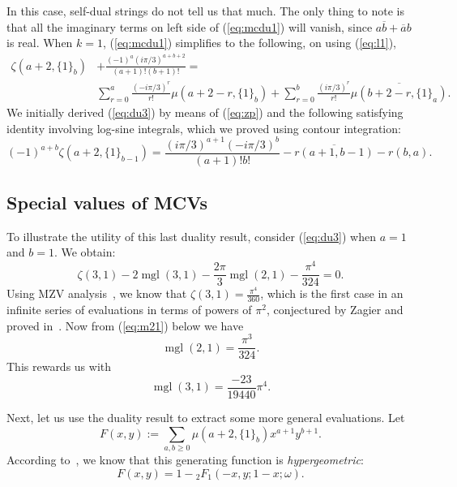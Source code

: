 \documentclass[a4paper,a4paper]{article}
\newcommand{\mgl}{\operatorname{mgl}}
\begin{document}
In this case, self-dual strings do not tell us that much.  The only thing
to note is that all the imaginary terms on left side of (\ref{eq:mcdu1})
will vanish, since $ a\overline{b} + \overline{a}b $ is real.
When $ k = 1 $, (\ref{eq:mcdu1}) simplifies to the following, on using
(\ref{eq:l1}),
\begin{equation}
\begin{split}
\label{eq:du3}
\zeta(a+2, \{ 1 \}_b) &+
\frac{(-1)^a (i\pi/3)^{a+b+2}}{(a+1)!(b+1)!} = \\
&\sum_{r=0}^a \frac{( -i\pi/3 )^r}{r!} \mu(a + 2 - r, \{ 1 \}_b)
+ \sum_{r=0}^b \frac{(i\pi/3)^r}{r!} \overline{\mu(b + 2 - r, \{ 1
\}_a)}.
\end{split}
\end{equation}
We initially derived (\ref{eq:du3}) by means of (\ref{eq:zp}) and the following
satisfying identity involving log-sine integrals, which we proved
using contour
integration:
\begin{equation}
\label{eq:jz}
(-1)^{a+b}\zeta(a+2, \{ 1 \}_{b-1}) =
 \frac{(i\pi/3)^{a+1}(-i\pi/3)^b}{(a+1)!b!} -
 \overline{r(a + 1, b - 1)} - r(b,a).
\end{equation}

\subsection{Special values of MCVs}

To illustrate the utility of this last duality result,
consider (\ref{eq:du3}) when $ a = 1 $ and $ b = 1 $.  We obtain:
$$
\zeta(3,1)-2\mgl(3,1)-\frac{2 \pi}{3} \mgl(2,1)-\frac{\pi^4}{324} =
0.
$$
Using MZV analysis~\cite{BBBL}, we know that
$ \zeta(3,1) = \frac{\pi^4}{360} $,
which is the first case in an infinite series of evaluations
in terms of powers of $\pi^2$, conjectured by Zagier and proved
in~\cite{BBBLC}.
Now from (\ref{eq:m21})    below we have $$ \mgl(2,1) = \frac{\pi^3}{324}
.$$
   This rewards us with $$ \mgl(3,1) = \frac{-23}{19440}\pi^4 .$$

Next, let us use the duality result to extract some more general evaluations.
Let
$$ F(x,y) := \sum_{a, b \ge 0} \mu(a + 2, \{ 1 \}_b) x^{a+1}
y^{b+1}.$$
According to~\cite{BBBL}, we know that this generating function is {\em
hypergeometric}:
\begin{equation}
\label{eq:gfo}
F(x,y) = 1 - {}_2F_1(-x, y; 1-x; \omega).
\end{equation}
\end{document}
